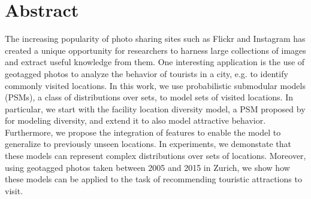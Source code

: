 \chapter*{Abstract}

The increasing popularity of photo sharing sites such as Flickr and Instagram has created a unique opportunity for researchers to harness large collections of images and extract useful knowledge from them. One interesting application is the use of geotagged photos to analyze the behavior of tourists in a city, e.g. to identify commonly visited locations. In this work, we use probabilistic submodular models (PSMs), a class of distributions over sets, to model sets of visited locations. In particular, we start with the facility location diversity model, a PSM proposed by \citet{tschiatschek16learning} for modeling diversity, and extend it to also model attractive behavior. Furthermore, we propose the integration of features to enable the model to generalize to previously unseen locations. In experiments, we demonstate that these models can represent complex distributions over sets of locations. Moreover, using geotagged photos taken between 2005 and 2015 in Zurich, we show how these models can be applied to the task of recommending touristic attractions to visit.